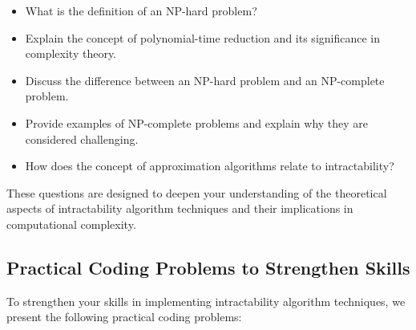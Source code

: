 \documentclass[12pt]{book} %
\begin{document}
\begin{itemize}
    \item What is the definition of an NP-hard problem?
    \item Explain the concept of polynomial-time reduction and its significance in complexity theory.
    \item Discuss the difference between an NP-hard problem and an NP-complete problem.
    \item Provide examples of NP-complete problems and explain why they are considered challenging.
    \item How does the concept of approximation algorithms relate to intractability?
\end{itemize}

These questions are designed to deepen your understanding of the theoretical aspects of intractability algorithm techniques and their implications in computational complexity.

\subsection{Practical Coding Problems to Strengthen Skills}

To strengthen your skills in implementing intractability algorithm techniques, we present the following practical coding problems:
\end{document}
